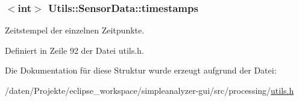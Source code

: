 \hypertarget{structUtils_1_1SensorData_a654f9606c3ddc6e93afb86a116d11ea5}{
\subsubsection[{timestamps}]{$<$int$>$ Utils\-::\-Sensor\-Data\-::timestamps}}\label{structUtils_1_1SensorData_a654f9606c3ddc6e93afb86a116d11ea5}


Zeitstempel der einzelnen Zeitpunkte. 



Definiert in Zeile 92 der Datei utils.\-h.



Die Dokumentation für diese Struktur wurde erzeugt aufgrund der Datei\-:\begin{DoxyCompactItemize}
\item 
/daten/\-Projekte/eclipse\-\_\-workspace/simpleanalyzer-\/gui/src/processing/\hyperlink{simpleanalyzer-gui_2src_2processing_2utils_8h}{utils.\-h}\end{DoxyCompactItemize}
